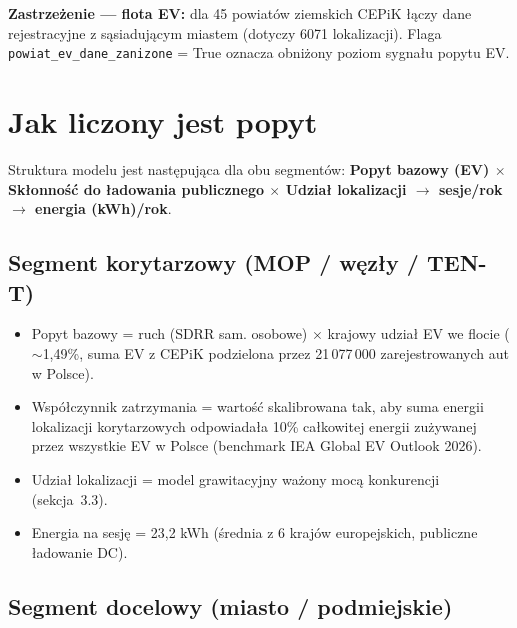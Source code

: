 \documentclass[11pt,a4paper]{article}
\begin{document}
	\begin{zastrzezenie}
		\textbf{Zastrzeżenie --- flota EV:} dla 45 powiatów ziemskich CEPiK łączy dane rejestracyjne z sąsiadującym miastem (dotyczy 6071 lokalizacji). Flaga \texttt{powiat\_ev\_dane\_zanizone} = True oznacza obniżony poziom sygnału popytu EV.
	\end{zastrzezenie}
	
	\newpage
	\section{Jak liczony jest popyt}
	
	Struktura modelu jest następująca dla obu segmentów: \textbf{Popyt bazowy
		(EV) $\times$ Skłonność do ładowania publicznego $\times$ Udział
		lokalizacji $\rightarrow$ sesje/rok $\rightarrow$ energia (kWh)/rok}.
	
	\subsection{Segment korytarzowy (MOP / węzły / TEN-T)}
	
	\begin{itemize}
		\item Popyt bazowy = ruch (SDRR sam. osobowe) $\times$ krajowy udział EV
		we flocie ($\sim$1,49\%, suma EV z CEPiK podzielona przez 21\,077\,000 zarejestrowanych aut w Polsce).
		
		\item Współczynnik zatrzymania = wartość skalibrowana tak, aby suma energii lokalizacji korytarzowych odpowiadała 10\% całkowitej energii zużywanej przez wszystkie EV w Polsce (benchmark IEA Global EV Outlook 2026).
		
		\item Udział lokalizacji = model grawitacyjny ważony mocą konkurencji (sekcja~3.3).
		
		\item Energia na sesję = 23,2 kWh (średnia z 6 krajów europejskich, publiczne ładowanie DC).
	\end{itemize}
	
	\subsection{Segment docelowy (miasto / podmiejskie)}
	
\end{document}
